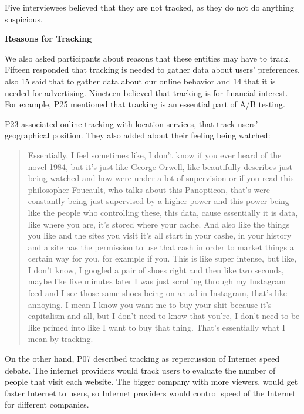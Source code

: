 Five interviewees believed that they are not tracked, as they do not do
anything suspicious.


\textbf{Reasons for Tracking}    

We also asked participants about reasons that these entities may have to
track. Fifteen responded that tracking is needed to gather data about users'
preferences, also 15 said that to gather data about our online behavior and 14
that it is needed for advertising. Nineteen believed that tracking is for
financial interest. For example, P25 mentioned that tracking is an essential
part of A/B testing. 

P23 associated online tracking with location services, that track users'
geographical position. They also added about their feeling being watched:

\begin{quote} Essentially, I feel sometimes like, I don't know if you ever
heard of the novel 1984, but it's just like George Orwell, like beautifully
describes just being watched and how were under a lot of supervision or if you
read this philosopher Foucault, who talks about this Panopticon, that's were
constantly being just supervised by a higher power and this power being like
the people who controlling these, this data, cause essentially it is data,
like where you are, it's stored where your cache. And also like the things you
like and the sites you visit it's all start in your cashe, in your history and
a site has the permission to use that cash in order to market things a certain
way for you, for example if you. This is like super intense, but like, I don't
know, I googled a pair of shoes right and then like two seconds, maybe like
five minutes later I was just scrolling through my Instagram feed and I see
those same shoes being on an ad in Instagram, that's like annoying. I mean I
know you want me to buy your shit because it's capitalism and all, but I don't
need to know that you're, I don't need to be like primed into like I want to
buy that thing. That's essentially what I mean by tracking.\end{quote}

On the other hand, P07 described tracking as repercussion of Internet speed
debate. The internet providers would track users to evaluate the number of
people that visit each website. The bigger company with more viewers, would
get faster Internet to users, so Internet providers would control speed of the
Internet for different companies. 








